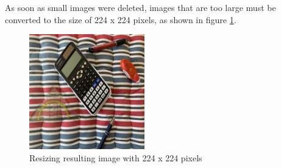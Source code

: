 \documentclass[../ImageClassifier.tex]{subfiles}
\begin{document}
As soon as small images were deleted, images that are too large must be converted to the size of 224 x 224 pixels, as shown in figure \ref{fig:resizing result}.
\begin{figure}[H]
    \centering
    \includegraphics[width=5cm,height=5cm]{./attachments/resize/resize_result.jpeg}
    \caption{Resizing resulting image with 224 x 224 pixels}
    \label{fig:resizing result}
\end{figure}
\end{document}
